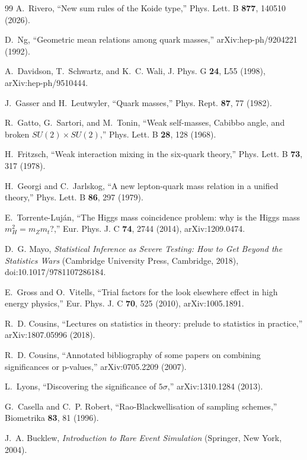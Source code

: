 \documentclass[aps,twocolumn,superscriptaddress,nofootinbib,floatfix]{revtex4-2}
\begin{document}
\begin{thebibliography}{99}
A.~Rivero, ``New sum rules of the Koide type,'' Phys. Lett. B \textbf{877}, 140510 (2026).

D.~Ng, ``Geometric mean relations among quark masses,'' arXiv:hep-ph/9204221 (1992).

A.~Davidson, T.~Schwartz, and K.~C. Wali, J. Phys. G \textbf{24}, L55 (1998), arXiv:hep-ph/9510444.

J.~Gasser and H.~Leutwyler, ``Quark masses,'' Phys. Rept. \textbf{87}, 77 (1982).

R.~Gatto, G.~Sartori, and M.~Tonin, ``Weak self-masses, Cabibbo angle, and broken $SU(2)\times SU(2)$,'' Phys. Lett. B \textbf{28}, 128 (1968).

H.~Fritzsch, ``Weak interaction mixing in the six-quark theory,'' Phys. Lett. B \textbf{73}, 317 (1978).

H.~Georgi and C.~Jarlskog, ``A new lepton-quark mass relation in a unified theory,'' Phys. Lett. B \textbf{86}, 297 (1979).

E.~Torrente-Luj\'an, ``The Higgs mass coincidence problem: why is the Higgs mass $m_H^2=m_Z m_t$?,'' Eur. Phys. J. C \textbf{74}, 2744 (2014), arXiv:1209.0474.

D.~G. Mayo, \emph{Statistical Inference as Severe Testing: How to Get Beyond the Statistics Wars} (Cambridge University Press, Cambridge, 2018), doi:10.1017/9781107286184.

E.~Gross and O.~Vitells, ``Trial factors for the look elsewhere effect in high energy physics,'' Eur. Phys. J. C \textbf{70}, 525 (2010), arXiv:1005.1891.

R.~D. Cousins, ``Lectures on statistics in theory: prelude to statistics in practice,'' arXiv:1807.05996 (2018).

R.~D. Cousins, ``Annotated bibliography of some papers on combining significances or p-values,'' arXiv:0705.2209 (2007).

L.~Lyons, ``Discovering the significance of $5\sigma$,'' arXiv:1310.1284 (2013).

G.~Casella and C.~P. Robert, ``Rao-Blackwellisation of sampling schemes,'' Biometrika \textbf{83}, 81 (1996).

J.~A. Bucklew, {\it Introduction to Rare Event Simulation} (Springer, New York, 2004).


\end{thebibliography}
\end{document}
